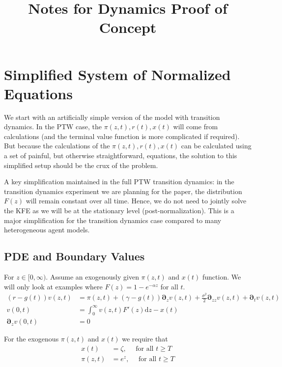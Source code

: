 \documentclass[11pt]{article}
\newcommand{\D}[1][]{\ensuremath{\boldsymbol{\partial}_{#1}}}
\newcommand{\diff}{\ensuremath{\mathrm{d}}}
\begin{document}
\title{Notes for Dynamics Proof of Concept}
\maketitle

\section{Simplified System of Normalized Equations}
We start with an artificially simple version of the model with transition dynamics.  In the PTW case, the $\pi(z,t), r(t), x(t)$ will come from  calculations (and the terminal value function is more complicated if required).  But because the calculations of the $\pi(z,t), r(t), x(t)$ can be calculated using a set of painful, but otherwise straightforward, equations, the solution to this simplified setup should be the crux of the problem.

A key simplification maintained in the full PTW transition dynamics: in the transition dynamics experiment we are planning for the paper, the distribution $F(z)$ will remain constant over all time.  Hence, we do not need to jointly solve the KFE as we will be at the stationary level (post-normalization).  This is a major simplification for the transition dynamics case compared to many heterogeneous agent models.

\subsection{PDE and Boundary Values}
For $z\in[0,\infty)$.  Assume an exogenously given $\pi(z,t)$ and $x(t)$ function.  We will only look at examples where $F(z) = 1 - e^{-\alpha z}$ for all $t$.
\begin{align}
	(r - g(t)) v(z,t) &= \pi(z,t) + (\gamma - g(t)) \D[z] v(z,t) + \tfrac{\sigma^2}{2} \D[zz] v(z,t) + \D[t]v(z,t)\label{eq:bellman-GBM-dynamic}	\\
v(0,t) &= \int_{0}^{\infty} v(z,t) F'(z)\diff z - x(t)\label{eq:vm-GBM-dynamic}\\
\D[z]v(0,t) &= 0\label{eq:sp-GBM-dynamic}
\end{align}

For the exogenous $\pi(z,t)$ and $x(t)$ we require that
\begin{align}
x(t) &= \zeta,\quad \text{ for all }t \geq T\label{eq:terminal-x}\\
\pi(z,t) &= e^z,\quad \text{ for all }t \geq T\label{eq:terminal-pi}
\end{align}
\end{document}
